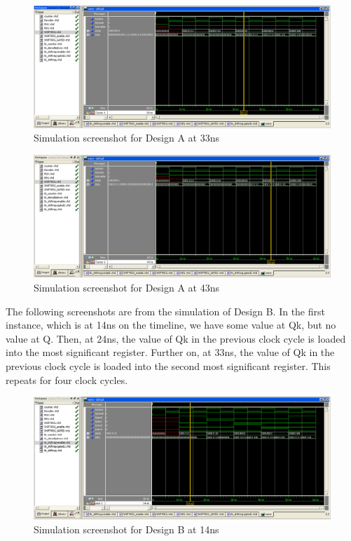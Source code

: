 \documentclass[11pt,a4paper]{article}
\begin{document}
\begin{figure}[htp]
\centering
\includegraphics[length = 4in,width = 6.5in]{./images/simsr1.png}
\caption{Simulation screenshot for Design A at 33ns}
\end{figure}

\begin{figure}[htp]
\centering
\includegraphics[length = 4in,width = 6.5in]{./images/simsr2.png}
\caption{Simulation screenshot for Design A at 43ns}
\end{figure}

\newpage
The following screenshots are from the simulation of Design B. In the first instance, which is at 14ns on the timeline, we have some value at Qk, but no value at Q. Then, at 24ns, the value of Qk in the previous clock cycle is loaded into the most significant register. Further on, at 33ns, the value of Qk in the previous clock cycle is loaded into the second most significant register. This repeats for four clock cycles.

\begin{figure}[htp]
\centering
\includegraphics[length = 4in,width = 6.5in]{./images/simsre1.png}
\caption{Simulation screenshot for Design B at 14ns}
\end{figure}
\end{document}
